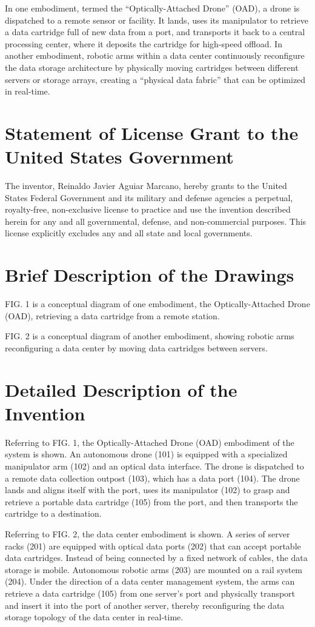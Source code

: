 \documentclass[11pt,letterpaper]{article}
\begin{document}
In one embodiment, termed the ``Optically-Attached Drone'' (OAD), a drone is dispatched to a remote sensor or facility. It lands, uses its manipulator to retrieve a data cartridge full of new data from a port, and transports it back to a central processing center, where it deposits the cartridge for high-speed offload. In another embodiment, robotic arms within a data center continuously reconfigure the data storage architecture by physically moving cartridges between different servers or storage arrays, creating a ``physical data fabric'' that can be optimized in real-time.

\section*{Statement of License Grant to the United States Government}

The inventor, Reinaldo Javier Aguiar Marcano, hereby grants to the United States Federal Government and its military and defense agencies a perpetual, royalty-free, non-exclusive license to practice and use the invention described herein for any and all governmental, defense, and non-commercial purposes. This license explicitly excludes any and all state and local governments.

\section*{Brief Description of the Drawings}

FIG. 1 is a conceptual diagram of one embodiment, the Optically-Attached Drone (OAD), retrieving a data cartridge from a remote station.

FIG. 2 is a conceptual diagram of another embodiment, showing robotic arms reconfiguring a data center by moving data cartridges between servers.

\section*{Detailed Description of the Invention}

Referring to FIG. 1, the Optically-Attached Drone (OAD) embodiment of the system is shown. An autonomous drone (101) is equipped with a specialized manipulator arm (102) and an optical data interface. The drone is dispatched to a remote data collection outpost (103), which has a data port (104). The drone lands and aligns itself with the port, uses its manipulator (102) to grasp and retrieve a portable data cartridge (105) from the port, and then transports the cartridge to a destination.

Referring to FIG. 2, the data center embodiment is shown. A series of server racks (201) are equipped with optical data ports (202) that can accept portable data cartridges. Instead of being connected by a fixed network of cables, the data storage is mobile. Autonomous robotic arms (203) are mounted on a rail system (204). Under the direction of a data center management system, the arms can retrieve a data cartridge (105) from one server's port and physically transport and insert it into the port of another server, thereby reconfiguring the data storage topology of the data center in real-time.
\end{document}
